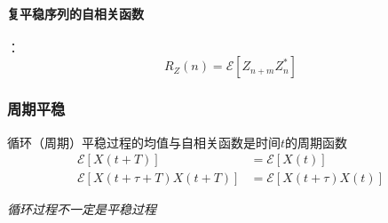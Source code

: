     \paragraph{复平稳序列的自相关函数}：\vspace{-0.5ex}
    \begin{equation}
        R_Z(n)=\mathscr{E}[Z_{n+m}Z_n^*]
    \end{equation}

    \subsubsection{周期平稳}
    循环（周期）平稳过程的均值与自相关函数是时间$t$的周期函数\vspace{-0.5ex}
    \begin{align}
        \mathscr{E}[X(t+T)]&=\mathscr{E}[X(t)]\\
        \mathscr{E}[X(t+\tau+T)X(t+T)]&=\mathscr{E}[X(t+\tau)X(t)]
    \end{align}

    \emph{循环过程不一定是平稳过程}

